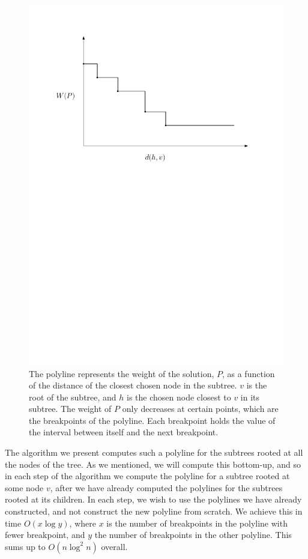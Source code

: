 \documentclass[11pt,a4paper]{article}
\theoremstyle{definition}
\theoremstyle{remark}
\begin{document}
\begin{figure}[h]
\begin{center}
\includegraphics[scale=0.35]{polyline}
\end{center}
\caption{The polyline represents the weight of the solution, $P$, as a function of the distance of the closest chosen node in the subtree. $v$ is the root of the subtree, and $h$ is the chosen node closest to $v$ in its subtree. The weight of $P$ only decreases at certain points, which are the breakpoints of the polyline. Each breakpoint holds the value of the interval between itself and the next breakpoint.
\label{figure of a polyline}}
\end{figure}

The algorithm we present computes such a polyline for the subtrees rooted at all the nodes of the tree. As we mentioned, we will compute this bottom-up, and so in each step of the algorithm we compute the polyline for a subtree rooted at some node $v$, after we have already computed the polylines for the subtrees rooted at its children. In each step, we wish to use the polylines we have already constructed, and not construct the new polyline from scratch. We achieve this in time $O(x \log y)$, where $x$ is the number of breakpoints in the polyline with fewer breakpoint, and $y$ the number of breakpoints in the other polyline. This sums up to $O(n \log ^2 n)$ overall.
\end{document}
